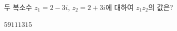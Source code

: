 두 복소수 $z_1=2-3i$, $z_2=2+3i$에 대하여 $z_1z_2$의 값은?
\begin{choices32}{$5$}{$9$}{$11$}{$13$}{$15$}\end{choices32}
